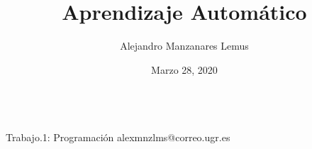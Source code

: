 \documentclass[10pt]{report}
\author{Alejandro Manzanares Lemus}
\title{Aprendizaje Automático}
\date{Marzo 28, 2020}
\begin{document}
\aqtitlepage[nolicense]
				{}
            {\\ Trabajo.1: Programación}
            {alexmnzlms@correo.ugr.es}

\tableofcontents


\end{document}

